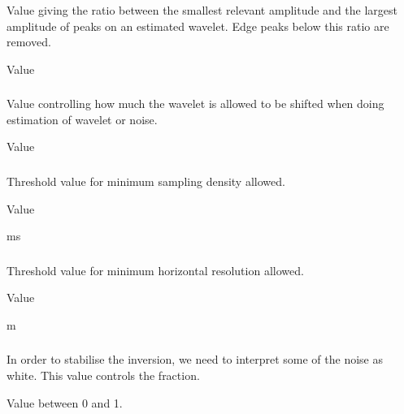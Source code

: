 \subsubsection{}
 \slist
   \item \Description Value giving the ratio between the smallest relevant amplitude and the largest amplitude of peaks on an estimated wavelet. Edge peaks below this ratio are removed.
   \item \Argument Value
   \item {}
 \elist

\subsubsection{}
 \slist
   \item \Description Value controlling how much the wavelet is allowed to be shifted when doing estimation of wavelet or noise.
   \item \Argument Value
   \item {}
 \elist

\subsubsection{}
 \slist
   \item \Description Threshold value for minimum sampling density allowed.
   \item \Argument Value
   \item {} ms
 \elist

\subsubsection{}
 \slist
   \item \Description Threshold value for minimum horizontal resolution allowed.
   \item \Argument Value
   \item {} m
 \elist

 \subsubsection{}
 \slist
   \item \Description In order to stabilise the inversion, we need to interpret some of the noise as white. This value controls the fraction.
   \item \Argument Value between 0 and 1.
   \item {}
 \elist


